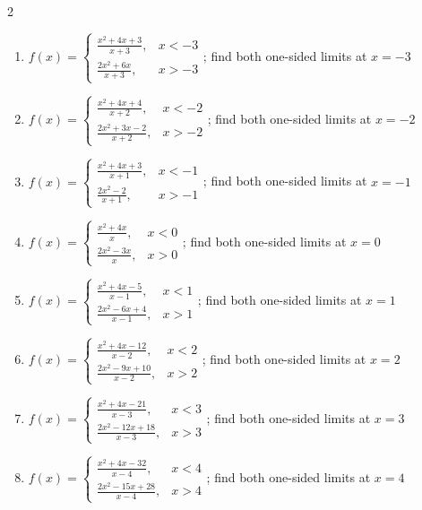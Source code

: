 \documentclass[11pt,oneside]{book}
\begin{document}
\begin{multicols}{2}
\begin{enumerate}[leftmargin=*,label=\textbf{\arabic*.},itemsep=0.65\baselineskip]
\item $f(x)=\begin{cases} \frac{x^{2} + 4 x + 3}{x + 3}, & x<-3\\ \frac{2 x^{2} + 6 x}{x + 3}, & x>-3 \end{cases}$; find both one-sided limits at $x=-3$
\item $f(x)=\begin{cases} \frac{x^{2} + 4 x + 4}{x + 2}, & x<-2\\ \frac{2 x^{2} + 3 x - 2}{x + 2}, & x>-2 \end{cases}$; find both one-sided limits at $x=-2$
\item $f(x)=\begin{cases} \frac{x^{2} + 4 x + 3}{x + 1}, & x<-1\\ \frac{2 x^{2} - 2}{x + 1}, & x>-1 \end{cases}$; find both one-sided limits at $x=-1$
\item $f(x)=\begin{cases} \frac{x^{2} + 4 x}{x}, & x<0\\ \frac{2 x^{2} - 3 x}{x}, & x>0 \end{cases}$; find both one-sided limits at $x=0$
\item $f(x)=\begin{cases} \frac{x^{2} + 4 x - 5}{x - 1}, & x<1\\ \frac{2 x^{2} - 6 x + 4}{x - 1}, & x>1 \end{cases}$; find both one-sided limits at $x=1$
\item $f(x)=\begin{cases} \frac{x^{2} + 4 x - 12}{x - 2}, & x<2\\ \frac{2 x^{2} - 9 x + 10}{x - 2}, & x>2 \end{cases}$; find both one-sided limits at $x=2$
\item $f(x)=\begin{cases} \frac{x^{2} + 4 x - 21}{x - 3}, & x<3\\ \frac{2 x^{2} - 12 x + 18}{x - 3}, & x>3 \end{cases}$; find both one-sided limits at $x=3$
\item $f(x)=\begin{cases} \frac{x^{2} + 4 x - 32}{x - 4}, & x<4\\ \frac{2 x^{2} - 15 x + 28}{x - 4}, & x>4 \end{cases}$; find both one-sided limits at $x=4$

\end{enumerate}
\end{multicols}
\end{document}
